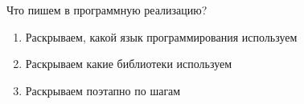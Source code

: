 Что пишем в программную реализацию?

\begin{enumerate}
	\item Раскрываем, какой язык программирования используем
	\item Раскрываем какие библиотеки используем
	\item Раскрываем поэтапно по шагам
\end{enumerate}